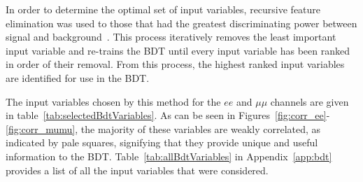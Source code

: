 In order to determine the optimal set of input variables, recursive feature elimination was used to those that had the greatest discriminating power between signal and background~\cite{Guyon2002}.
This process iteratively removes the least important input variable and re-trains the BDT until every input variable has been ranked in order of their removal.
From this process, the highest ranked input variables are identified for use in the BDT.

The input variables chosen by this method for the $ee$ and $\mu\mu$ channels are given in table~\ref{tab:selectedBdtVariables}.
As can be seen in Figures~\ref{fig:corr_ee}-\ref{fig:corr_mumu}, the majority of these variables are weakly correlated, as indicated by pale squares, signifying that they provide unique and useful information to the BDT.
Table~\ref{tab:allBdtVariables} in Appendix~\ref{app:bdt} provides a list of all the input variables that were considered.

